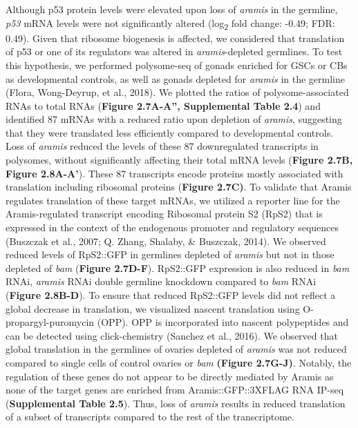 \documentclass[12pt,oneside]{reedthesis}
\begin{document}
Although p53 protein levels were elevated upon loss of \emph{aramis} in the germline, \emph{p53} mRNA levels were not significantly altered (log\textsubscript{2} fold change: -0.49; FDR: 0.49). Given that ribosome biogenesis is affected, we considered that translation of p53 or one of its regulators was altered in \emph{aramis}-depleted germlines. To test this hypothesis, we performed polysome-seq of gonads enriched for GSCs or CBs as developmental controls, as well as gonads depleted for \emph{aramis} in the germline (Flora, Wong-Deyrup, et al., 2018). We plotted the ratios of polysome-associated RNAs to total RNAs (\textbf{Figure 2.7A-A'', Supplemental Table 2.4}) and identified 87 mRNAs with a reduced ratio upon depletion of \emph{aramis}, suggesting that they were translated less efficiently compared to developmental controls. Loss of \emph{aramis} reduced the levels of these 87 downregulated transcripts in polysomes, without significantly affecting their total mRNA levels (\textbf{Figure 2.7B, Figure 2.8A-A'}). These 87 transcripts encode proteins mostly associated with translation including ribosomal proteins (\textbf{Figure 2.7C)}. To validate that Aramis regulates translation of these target mRNAs, we utilized a reporter line for the Aramis-regulated transcript encoding Ribosomal protein S2 (RpS2) that is expressed in the context of the endogenous promoter and regulatory sequences (Buszczak et al., 2007; Q. Zhang, Shalaby, \& Buszczak, 2014). We observed reduced levels of RpS2::GFP in germlines depleted of \emph{aramis} but not in those depleted of \emph{bam} (\textbf{Figure 2.7D-F}). RpS2::GFP expression is also reduced in \emph{bam} RNAi, \emph{aramis} RNAi double germline knockdown compared to \emph{bam} RNAi (\textbf{Figure 2.8B-D}). To ensure that reduced RpS2::GFP levels did not reflect a global decrease in translation, we visualized nascent translation using O-propargyl-puromycin (OPP). OPP is incorporated into nascent polypeptides and can be detected using click-chemistry (Sanchez et al., 2016). We observed that global translation in the germlines of ovaries depleted of \emph{aramis} was not reduced compared to single cells of control ovaries or \emph{bam} \textbf{(Figure 2.7G-J)}. Notably, the regulation of these genes do not appear to be directly mediated by Aramis as none of the target genes are enriched from Aramis::GFP::3XFLAG RNA IP-seq (\textbf{Supplemental Table 2.5}). Thus, loss of \emph{aramis} results in reduced translation of a subset of transcripts compared to the rest of the transcriptome.
\end{document}
